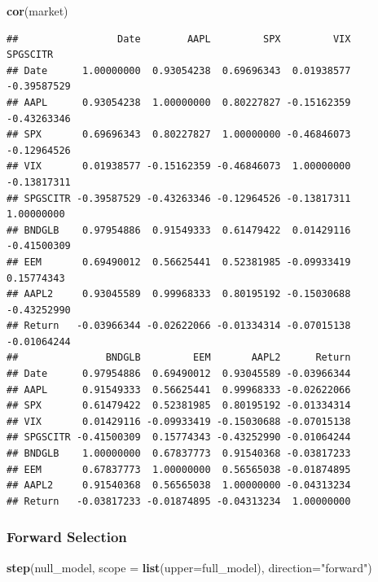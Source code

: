 \documentclass[]{article}
\newenvironment{Shaded}{\begin{snugshade}}{\end{snugshade}}
\newcommand{\KeywordTok}[1]{\textcolor[rgb]{0.13,0.29,0.53}{\textbf{#1}}}
\newcommand{\DataTypeTok}[1]{\textcolor[rgb]{0.13,0.29,0.53}{#1}}
\newcommand{\StringTok}[1]{\textcolor[rgb]{0.31,0.60,0.02}{#1}}
\newcommand{\NormalTok}[1]{#1}
\begin{document}
\begin{Shaded}
\begin{Highlighting}[]
\KeywordTok{cor}\NormalTok{(market)}
\end{Highlighting}
\end{Shaded}

\begin{verbatim}
##                 Date        AAPL         SPX         VIX    SPGSCITR
## Date      1.00000000  0.93054238  0.69696343  0.01938577 -0.39587529
## AAPL      0.93054238  1.00000000  0.80227827 -0.15162359 -0.43263346
## SPX       0.69696343  0.80227827  1.00000000 -0.46846073 -0.12964526
## VIX       0.01938577 -0.15162359 -0.46846073  1.00000000 -0.13817311
## SPGSCITR -0.39587529 -0.43263346 -0.12964526 -0.13817311  1.00000000
## BNDGLB    0.97954886  0.91549333  0.61479422  0.01429116 -0.41500309
## EEM       0.69490012  0.56625441  0.52381985 -0.09933419  0.15774343
## AAPL2     0.93045589  0.99968333  0.80195192 -0.15030688 -0.43252990
## Return   -0.03966344 -0.02622066 -0.01334314 -0.07015138 -0.01064244
##               BNDGLB         EEM       AAPL2      Return
## Date      0.97954886  0.69490012  0.93045589 -0.03966344
## AAPL      0.91549333  0.56625441  0.99968333 -0.02622066
## SPX       0.61479422  0.52381985  0.80195192 -0.01334314
## VIX       0.01429116 -0.09933419 -0.15030688 -0.07015138
## SPGSCITR -0.41500309  0.15774343 -0.43252990 -0.01064244
## BNDGLB    1.00000000  0.67837773  0.91540368 -0.03817233
## EEM       0.67837773  1.00000000  0.56565038 -0.01874895
## AAPL2     0.91540368  0.56565038  1.00000000 -0.04313234
## Return   -0.03817233 -0.01874895 -0.04313234  1.00000000
\end{verbatim}

\subsubsection{Forward Selection}\label{forward-selection}

\begin{Shaded}
\begin{Highlighting}[]
\KeywordTok{step}\NormalTok{(null_model, }\DataTypeTok{scope =} \KeywordTok{list}\NormalTok{(}\DataTypeTok{upper=}\NormalTok{full_model), }\DataTypeTok{direction=}\StringTok{"forward"}\NormalTok{)}
\end{Highlighting}
\end{Shaded}
\end{document}
